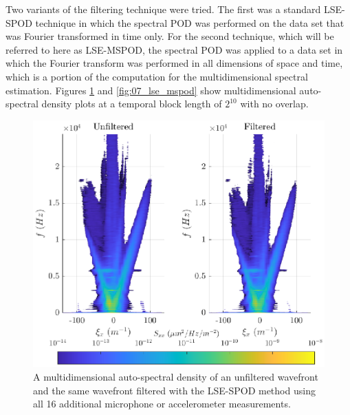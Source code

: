 Two variants of the filtering technique were tried.
The first was a standard LSE-SPOD technique in which the spectral POD was performed on the data set that was Fourier transformed in time only.
For the second technique, which will be referred to here as LSE-MSPOD, the spectral POD was applied to a data set in which the Fourier transform was performed in all dimensions of space and time, which is a portion of the computation for the multidimensional spectral estimation.
Figures \ref{fig:07_lse_spod} and \ref{fig:07_lse_mspod} show multidimensional auto-spectral density plots at a temporal block length of $2^{10}$ with no overlap.
\begin{figure}
  \centering
  \includegraphics{../matlab/07_multiple_sensor_filtering/lse_spod.eps}
  \caption{A multidimensional auto-spectral density of an unfiltered wavefront and the same wavefront filtered with the LSE-SPOD method using all 16 additional microphone or accelerometer measurements.  }
  \label{fig:07_lse_spod}
\end{figure}
